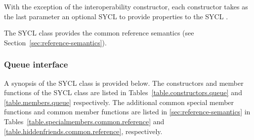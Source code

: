 With the exception of the interoperability constructor, each constructor takes as the last
parameter an optional SYCL  to provide properties to
the SYCL .

The SYCL  class provides the common reference semantics
(see Section~\ref{sec:reference-semantics}).

\subsubsection{Queue interface}

A synopsis of the SYCL  class is provided below. The
constructors and member functions of the SYCL  class are
listed in Tables~\ref{table.constructors.queue} and \ref{table.members.queue}
respectively. The additional common special member functions and common member
functions are listed in \ref{sec:reference-semantics} in
Tables~\ref{table.specialmembers.common.reference} and
\ref{table.hiddenfriends.common.reference}, respectively.


